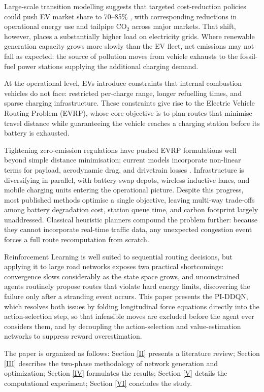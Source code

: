 \documentclass[conference]{IEEEtran}
\begin{document}
Large-scale transition modelling suggests that targeted cost-reduction policies could push EV market share to 70--85\% \cite{b2}, with corresponding reductions in operational energy use and tailpipe CO$_2$ across major markets. That shift, however, places a substantially higher load on electricity grids. Where renewable generation capacity grows more slowly than the EV fleet, net emissions may not fall as expected: the source of pollution moves from vehicle exhausts to the fossil-fuel power stations supplying the additional charging demand.

At the operational level, EVs introduce constraints that internal combustion vehicles do not face: restricted per-charge range, longer refuelling times, and sparse charging infrastructure. These constraints give rise to the Electric Vehicle Routing Problem (EVRP), whose core objective is to plan routes that minimise travel distance while guaranteeing the vehicle reaches a charging station before its battery is exhausted.

Tightening zero-emission regulations have pushed EVRP formulations well beyond simple distance minimisation; current models incorporate non-linear terms for payload, aerodynamic drag, and drivetrain losses \cite{b3}. Infrastructure is diversifying in parallel, with battery-swap depots, wireless inductive lanes, and mobile charging units entering the operational picture. Despite this progress, most published methods optimise a single objective, leaving multi-way trade-offs among battery degradation cost, station queue time, and carbon footprint largely unaddressed. Classical heuristic planners compound the problem further: because they cannot incorporate real-time traffic data, any unexpected congestion event forces a full route recomputation from scratch.

Reinforcement Learning is well suited to sequential routing decisions, but applying it to large road networks exposes two practical shortcomings: convergence slows considerably as the state space grows, and unconstrained agents routinely propose routes that violate hard energy limits, discovering the failure only after a stranding event occurs. This paper presents the PI-DDQN, which resolves both issues by folding longitudinal force equations directly into the action-selection step, so that infeasible moves are excluded before the agent ever considers them, and by decoupling the action-selection and value-estimation networks to suppress reward overestimation.

The paper is organized as follows: Section \ref{II} presents a literature review; Section \ref{III} describes the two-phase methodology of network generation and optimization; Section \ref{IV} formulates the results; Section \ref{V} details the computational experiment; Section \ref{VI} concludes the study.
\end{document}
